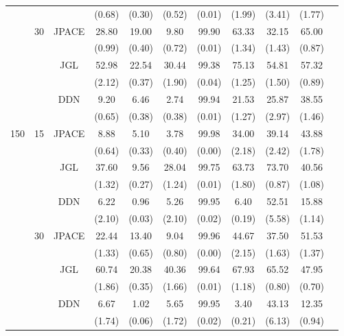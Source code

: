 \documentclass[useAMS,usenatbib,referee]{bio}
\begin{document}
{\begin{table}[htb!]
{\begin{tabular}{||c|c|c||c|c|c|c|c|c|c||c}
 & & & (0.68) & (0.30) & (0.52) & (0.01) & (1.99) & (3.41) & (1.77) \\\cline{2-10} 
  &\multirow{6}{*}{30}  & \multirow{2}{*}{JPACE} &28.80 & 19.00 & 9.80 & 99.90 & 63.33 & 32.15 & 65.00 \\ 
& & & (0.99) & (0.40) & (0.72) & (0.01) & (1.34) & (1.43) & (0.87) \\ \cline{3-10} 
& & \multirow{2}{*}{JGL} & 52.98 & 22.54 & 30.44 & 99.38 & 75.13 & 54.81 & 57.32 \\ 
 & & & (2.12) & (0.37) & (1.90) & (0.04) & (1.25) & (1.50) & (0.89) \\ \cline{3-10} 
& & \multirow{2}{*}{DDN} & 9.20 & 6.46 & 2.74 & 99.94 & 21.53 & 25.87 & 38.55 \\ 
 & & & (0.65) & (0.38) & (0.38) & (0.01) & (1.27) & (2.97) & (1.46) \\\cline{1-10} 
\multirow{12}{*}{150}  &\multirow{6}{*}{15}  & \multirow{2}{*}{JPACE} &8.88 & 5.10 & 3.78 & 99.98 & 34.00 & 39.14 & 43.88 \\ 
& & & (0.64) & (0.33) & (0.40) & (0.00) & (2.18) & (2.42) & (1.78) \\ \cline{3-10} 
& & \multirow{2}{*}{JGL} & 37.60 & 9.56 & 28.04 & 99.75 & 63.73 & 73.70 & 40.56 \\ 
 & & & (1.32) & (0.27) & (1.24) & (0.01) & (1.80) & (0.87) & (1.08) \\ \cline{3-10} 
& & \multirow{2}{*}{DDN} & 6.22 & 0.96 & 5.26 & 99.95 & 6.40 & 52.51 & 15.88 \\ 
 & & & (2.10) & (0.03) & (2.10) & (0.02) & (0.19) & (5.58) & (1.14) \\\cline{2-10} 
  &\multirow{6}{*}{30}  & \multirow{2}{*}{JPACE} &22.44 & 13.40 & 9.04 & 99.96 & 44.67 & 37.50 & 51.53 \\ 
& & & (1.33) & (0.65) & (0.80) & (0.00) & (2.15) & (1.63) & (1.37) \\ \cline{3-10} 
& & \multirow{2}{*}{JGL} & 60.74 & 20.38 & 40.36 & 99.64 & 67.93 & 65.52 & 47.95 \\ 
 & & & (1.86) & (0.35) & (1.66) & (0.01) & (1.18) & (0.80) & (0.70) \\ \cline{3-10} 
& & \multirow{2}{*}{DDN} & 6.67 & 1.02 & 5.65 & 99.95 & 3.40 & 43.13 & 12.35 \\ 
 & & & (1.74) & (0.06) & (1.72) & (0.02) & (0.21) & (6.13) & (0.94) \\\cline{1-10} 

\end{tabular}
}
\end{table}



}
\end{document}
